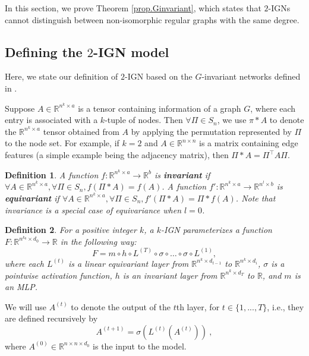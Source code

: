 \documentclass{article}
\newtheorem{definition}{Definition}
\begin{document}
In this section, we prove Theorem \ref{prop.Ginvariant}, which states that $2$-IGNs cannot distinguish between non-isomorphic regular graphs with the same degree.

\subsection{Defining the $2$-IGN model}
\label{app:2ign}
Here, we state our definition of $2$-IGN based on the $G$-invariant networks defined in \cite{maron2019universality}.

Suppose $A \in \mathbb{R}^{n^k \times a}$ is a tensor containing information of a graph $G$, where each entry is associated with a $k$-tuple of nodes. Then $\forall \Pi \in S_n$, we use $\pi * A$ to denote the $\mathbb{R}^{n^k \times a}$ tensor obtained from $A$ by applying the permutation represented by $\Pi$ to the node set. For example, if $k=2$ and $A\in \mathbb{R}^{n \times n}$ is a matrix containing edge features (a simple example being the adjacency matrix), then $\Pi * A = \Pi^\intercal A \Pi$.

\begin{definition}
A function $f: \mathbb{R}^{n^k \times a} \to \mathbb{R}^b$ is \textbf{invariant} if $\forall A \in \mathbb{R}^{n^k \times a}, \forall \Pi \in S_n, f(\Pi * A) = f(A)$. A function $f': \mathbb{R}^{n^k \times a} \to \mathbb{R}^{n^l \times b}$ is \textbf{equivariant} if $\forall A \in \mathbb{R}^{n^k \times a}, \forall \Pi \in S_n, f'(\Pi * A) = \Pi * f(A)$. Note that invariance is a special case of equivariance when $l = 0$.
\end{definition}

\begin{definition}
For a positive integer $k$, a $k$-IGN parameterizes a function $F: \mathbb{R}^{n^{k_{0}} \times d_{0}} \to \mathbb{R}$ in the following way:
\[
F = m \circ h \circ L^{(T)} \circ \sigma \circ \dots \circ \sigma \circ L^{(1)},
\]
where each $L^{(t)}$ is a linear equivariant layer from $\mathbb{R}^{n^{k} \times d_{t-1}}$ to $\mathbb{R}^{n^k \times d_{i}}$, $\sigma$ is a pointwise activation function, $h$ is an invariant layer from $\mathbb{R}^{n^{k} \times d_{T}}$ to $\mathbb{R}$, and $m$ is an MLP.
\end{definition}

We will use $A^{(t)}$ to denote the output of the $t$th layer, for $t \in \{1, ..., T\}$, i.e., they are defined recursively by
\[
A^{(t+1)} = \sigma(L^{(t)}(A^{(t)}))~,
\]
where $A^{(0)} \in \mathbb{R}^{n \times n \times d_0}$ is the input to the model.
\end{document}
